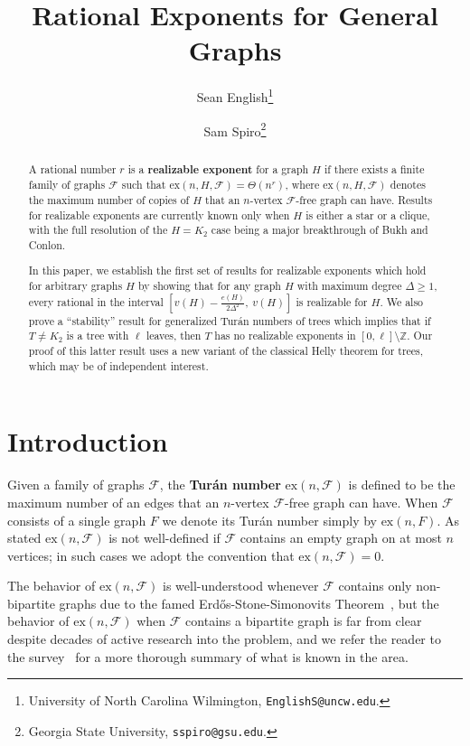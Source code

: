 \documentclass[12pt,letterpaper]{article}
\title{}
\author{}
\date{}
\title{Rational Exponents for General Graphs}
\author{Sean English\thanks{University of North Carolina Wilmington, \texttt{EnglishS@uncw.edu}.} \and Sam Spiro\thanks{Georgia State University, \texttt{sspiro@gsu.edu}.}}
\theoremstyle{definition}
\newcommand{\ex}{\mathrm{ex}}
\renewcommand{\c}[1]{\mathcal{#1}}
\begin{document}
	
	\maketitle
	
	
	\begin{abstract}
		A rational number $r$ is a \textbf{realizable exponent} for a graph $H$ if there exists a finite family of graphs $\mathcal{F}$ such that $\mathrm{ex}(n,H,\mathcal{F})=\Theta(n^r)$, where $\mathrm{ex}(n,H,\mathcal{F})$ denotes the maximum number of copies of $H$ that an $n$-vertex $\mathcal{F}$-free graph can have. Results for realizable exponents are currently known only when $H$ is either a star or a clique, with the full resolution of the $H=K_2$ case being a major breakthrough of Bukh and Conlon.  
		
		In this paper, we establish the first set of results for realizable exponents which hold for arbitrary graphs $H$ by showing that for any graph $H$ with maximum degree $\Delta \ge 1$, every rational in the interval $\left[v(H)-\frac{e(H)}{2\Delta^2},\ v(H)\right]$ is realizable for $H$. We also prove a ``stability'' result for generalized Tur\'an numbers of trees which implies that if $T\ne K_2$ is a tree with $\ell$ leaves, then $T$ has no realizable exponents in $[0,\ell]\setminus \mathbb{Z}$.  Our proof of this latter result uses a new variant of the classical Helly theorem for trees, which may be of independent interest.
	\end{abstract}
	
	
	\section{Introduction}
	Given a family of graphs $\c{F}$, the \textbf{Tur\'an number} $\ex(n,\c{F})$ is defined to be the maximum number of an edges that an $n$-vertex $\c{F}$-free graph can have.  When $\c{F}$ consists of a single graph $F$ we denote its Tur\'an number simply by $\ex(n,F)$.  As stated $\ex(n,\c{F})$ is not well-defined if $\c{F}$ contains an empty graph on at most $n$ vertices; in such cases we adopt the convention that $\ex(n,\c{F})=0$.
	
	The behavior of $\ex(n,\c{F})$ is well-understood whenever $\c{F}$ contains only non-bipartite graphs due to the famed Erd\H{o}s-Stone-Simonovits Theorem~\cite{ES1946}, but the behavior of $\ex(n,\c{F})$ when $\c{F}$ contains a bipartite graph is far from clear despite decades of active research into the problem, and we refer the reader to the survey~\cite{FS2013} for a more thorough summary of what is known in the area.
	
\end{document}
